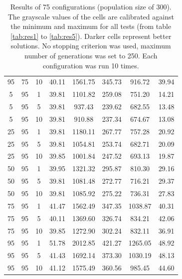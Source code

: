 \begin{table}[H]
\begin{tabular}{ccc|c|c|c|c|c}
95 & 75 & 10 & \cellcolor{gray!78}40.11 & \cellcolor{gray!1}1561.75 & \cellcolor{gray!1}345.73 & \cellcolor{gray!2}916.72 & 39.94\\
5 & 95 & 1 & \cellcolor{gray!80}39.81 & \cellcolor{gray!18}1101.82 & \cellcolor{gray!4}259.08 & \cellcolor{gray!52}751.20 & 14.21\\
5 & 95 & 5 & \cellcolor{gray!80}39.81 & \cellcolor{gray!45}937.43 & \cellcolor{gray!22}239.62 & \cellcolor{gray!74}682.55 & 13.48\\
5 & 95 & 10 & \cellcolor{gray!80}39.81 & \cellcolor{gray!50}910.88 & \cellcolor{gray!24}237.34 & \cellcolor{gray!76}674.67 & 13.08\\
25 & 95 & 1 & \cellcolor{gray!80}39.81 & \cellcolor{gray!5}1180.11 & \cellcolor{gray!1}267.77 & \cellcolor{gray!51}757.28 & 20.92\\
25 & 95 & 5 & \cellcolor{gray!80}39.81 & \cellcolor{gray!26}1054.81 & \cellcolor{gray!8}253.74 & \cellcolor{gray!73}682.71 & 20.09\\
25 & 95 & 10 & \cellcolor{gray!80}39.85 & \cellcolor{gray!34}1001.84 & \cellcolor{gray!14}247.52 & \cellcolor{gray!70}693.13 & 19.87\\
50 & 95 & 1 & \cellcolor{gray!79}39.95 & \cellcolor{gray!1}1321.32 & \cellcolor{gray!1}295.87 & \cellcolor{gray!34}810.30 & 29.16\\
50 & 95 & 5 & \cellcolor{gray!80}39.81 & \cellcolor{gray!21}1081.48 & \cellcolor{gray!1}272.77 & \cellcolor{gray!63}716.21 & 29.37\\
50 & 95 & 10 & \cellcolor{gray!80}39.81 & \cellcolor{gray!20}1085.92 & \cellcolor{gray!1}275.22 & \cellcolor{gray!57}736.31 & 27.83\\
75 & 95 & 1 & \cellcolor{gray!64}41.47 & \cellcolor{gray!1}1562.49 & \cellcolor{gray!1}347.35 & \cellcolor{gray!1}1038.87 & 40.31\\
75 & 95 & 5 & \cellcolor{gray!78}40.11 & \cellcolor{gray!1}1369.60 & \cellcolor{gray!1}326.74 & \cellcolor{gray!27}834.21 & 42.06\\
75 & 95 & 10 & \cellcolor{gray!80}39.85 & \cellcolor{gray!1}1272.90 & \cellcolor{gray!1}302.24 & \cellcolor{gray!28}832.11 & 36.91\\
95 & 95 & 1 & \cellcolor{gray!1}51.78 & \cellcolor{gray!1}2012.85 & \cellcolor{gray!1}421.27 & \cellcolor{gray!1}1265.05 & 48.92\\
95 & 95 & 5 & \cellcolor{gray!64}41.43 & \cellcolor{gray!1}1692.14 & \cellcolor{gray!1}373.30 & \cellcolor{gray!1}1030.19 & 48.13\\
95 & 95 & 10 & \cellcolor{gray!67}41.12 & \cellcolor{gray!1}1575.49 & \cellcolor{gray!1}360.56 & \cellcolor{gray!1}985.45 & 44.60
\end{tabular}
\caption{Results of 75 configurations (population size of 300). The grayscale values of the cells are calibrated against the minimum and maximum for all tests (from table \ref{tab:res1} to \ref{tab:res5}). Darker cells represent better solutions. No stopping criterion was used, maximum number of generations was set to 250. Each configuration was run 10 times.}
\label{tab:res2}
\end{table}


